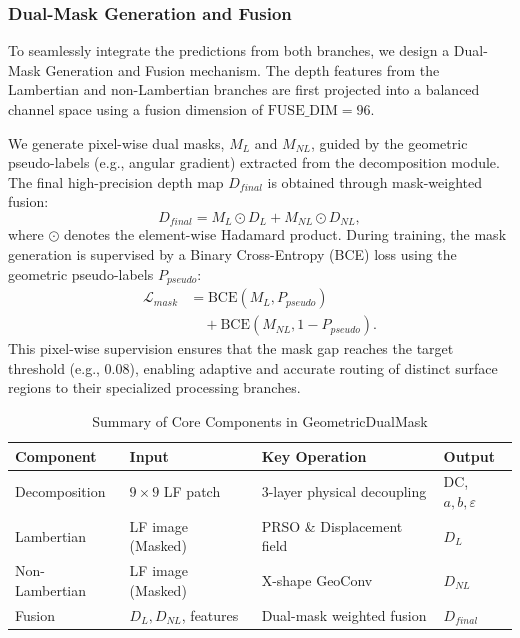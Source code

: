 \documentclass[lettersize,journal]{IEEEtran}
\begin{document}
\subsubsection{Dual-Mask Generation and Fusion}
To seamlessly integrate the predictions from both branches, we design a Dual-Mask Generation and Fusion mechanism. The depth features from the Lambertian and non-Lambertian branches are first projected into a balanced channel space using a fusion dimension of $\text{FUSE\_DIM}=96$. 

We generate pixel-wise dual masks, $M_L$ and $M_{NL}$, guided by the geometric pseudo-labels (e.g., angular gradient) extracted from the decomposition module. The final high-precision depth map $D_{final}$ is obtained through mask-weighted fusion:
\begin{equation}
    D_{final} = M_L \odot D_L + M_{NL} \odot D_{NL},
    \label{eq:ch3_4}
\end{equation}
where $\odot$ denotes the element-wise Hadamard product. During training, the mask generation is supervised by a Binary Cross-Entropy (BCE) loss using the geometric pseudo-labels $P_{pseudo}$:
\begin{align}
    \mathcal{L}_{mask} &= \text{BCE}(M_L, P_{pseudo}) \nonumber \\
    &\quad + \text{BCE}(M_{NL}, 1 - P_{pseudo}).
    \label{eq:ch3_5}
\end{align}
This pixel-wise supervision ensures that the mask gap reaches the target threshold (e.g., $0.08$), enabling adaptive and accurate routing of distinct surface regions to their specialized processing branches.

\begin{table}[!t]
\centering
\caption{Summary of Core Components in GeometricDualMask}
\label{tab:core_components}
\begin{tabular}{@{}llll@{}}
\toprule
\textbf{Component} & \textbf{Input} & \textbf{Key Operation} & \textbf{Output} \\
\midrule
Decomposition & $9 \times 9$ LF patch & 3-layer physical decoupling & DC, $a, b, \varepsilon$ \\
Lambertian & LF image (Masked) & PRSO \& Displacement field & $D_L$ \\
Non-Lambertian & LF image (Masked) & X-shape GeoConv & $D_{NL}$ \\
Fusion & $D_L, D_{NL}$, features & Dual-mask weighted fusion & $D_{final}$ \\
\bottomrule
\end{tabular}
\end{table}
\end{document}
